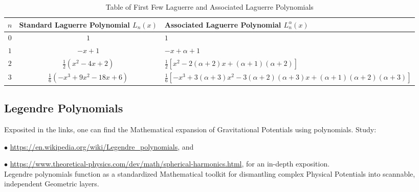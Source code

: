 \documentclass[a4paper, 10pt, onepage]{elegantbook}
\begin{document}
\begin{table}[htbp]
\centering
\caption{Table of First Few Laguerre and Associated Laguerre Polynomials}
\label{tab:laguerre_polynomials}
\begin{tabular}{ccl}
\toprule
$n$ & Standard Laguerre Polynomial $L_n(x)$ & Associated Laguerre Polynomial $L_n^\alpha(x)$ \\
\midrule
$0$ & $1$ & $1$ \\
\addlinespace
$1$ & $-x + 1$ & $-x + \alpha + 1$ \\
\addlinespace
$2$ & $\frac{1}{2}(x^2 - 4x + 2)$ & $\frac{1}{2}\left[x^2 - 2(\alpha + 2)x + (\alpha + 1)(\alpha + 2)\right]$ \\
\addlinespace
$3$ & $\frac{1}{6}(-x^3 + 9x^2 - 18x + 6)$ & $\frac{1}{6}\left[-x^3 + 3(\alpha + 3)x^2 - 3(\alpha + 2)(\alpha + 3)x + (\alpha + 1)(\alpha + 2)(\alpha + 3)\right]$ \\
\bottomrule
\end{tabular}
\end{table}


\subsection{Legendre Polynomials}
\label{Legendre Polynomials}
Exposited in the links, one can find the Mathematical expansion of Gravitational Potentials using polynomials. Study:

$\bullet$ \url{https://en.wikipedia.org/wiki/Legendre_polynomials}, and

$\bullet$ \url{https://www.theoretical-physics.com/dev/math/spherical-harmonics.html}, for an in-depth exposition.  \\

Legendre polynomials function as a standardized Mathematical toolkit for dismantling complex Physical Potentials into scannable, independent Geometric layers.
\end{document}
